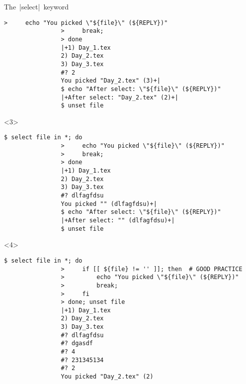 \begin{frame}[fragile]{The \,\bash|select|\, keyword}
\begin{overlayarea}{\textwidth}{\textheight}
\begin{onlyenv}
\begin{lstlisting}[style=MyBash]
                >     echo "You picked \"${file}\" (${REPLY})"
                >     break;
                > done
                |+1) Day_1.tex
                2) Day_2.tex
                3) Day_3.tex
                #? 2
                You picked "Day_2.tex" (3)+|
                $ echo "After select: \"${file}\" (${REPLY})"
                |+After select: "Day_2.tex" (2)+|
                $ unset file
            \end{lstlisting}
        \end{onlyenv}
        \begin{onlyenv}<3>
            \begin{lstlisting}[style=MyBash]
                $ select file in *; do
                >     echo "You picked \"${file}\" (${REPLY})"
                >     break;
                > done
                |+1) Day_1.tex
                2) Day_2.tex
                3) Day_3.tex
                #? dlfagfdsu
                You picked "" (dlfagfdsu)+|
                $ echo "After select: \"${file}\" (${REPLY})"
                |+After select: "" (dlfagfdsu)+|
                $ unset file
            \end{lstlisting}
        \end{onlyenv}
        \begin{onlyenv}<4>
            \begin{lstlisting}[style=MyBash]
                $ select file in *; do
                >     if [[ ${file} != '' ]]; then  # GOOD PRACTICE
                >         echo "You picked \"${file}\" (${REPLY})"
                >         break;
                >     fi
                > done; unset file
                |+1) Day_1.tex
                2) Day_2.tex
                3) Day_3.tex
                #? dlfagfdsu
                #? dgasdf
                #? 4
                #? 231345134
                #? 2
                You picked "Day_2.tex" (2)
            \end{lstlisting}
        \end{onlyenv}
    \end{overlayarea}
\end{frame}




















